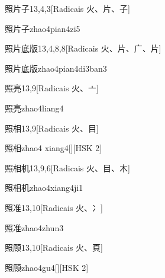 \begin{entry}{照片子}{13,4,3}[Radicais ⽕、⽚、⼦]
  \begin{phonetics}{照片子}{zhao4pian4zi5}
  \end{phonetics}
\end{entry}

\begin{entry}{照片底版}{13,4,8,8}[Radicais ⽕、⽚、⼴、⽚]
  \begin{phonetics}{照片底版}{zhao4pian4di3ban3}
  \end{phonetics}
\end{entry}

\begin{entry}{照亮}{13,9}[Radicais ⽕、⼇]
  \begin{phonetics}{照亮}{zhao4liang4}
  \end{phonetics}
\end{entry}

\begin{entry}{照相}{13,9}[Radicais ⽕、⽬]
  \begin{phonetics}{照相}{zhao4 xiang4}[][HSK 2]
  \end{phonetics}
\end{entry}

\begin{entry}{照相机}{13,9,6}[Radicais ⽕、⽬、⽊]
  \begin{phonetics}{照相机}{zhao4xiang4ji1}
  \end{phonetics}
\end{entry}

\begin{entry}{照准}{13,10}[Radicais ⽕、⼎]
  \begin{phonetics}{照准}{zhao4zhun3}
  \end{phonetics}
\end{entry}

\begin{entry}{照顾}{13,10}[Radicais ⽕、⾴]
  \begin{phonetics}{照顾}{zhao4gu4}[][HSK 2]
  \end{phonetics}
\end{entry}

